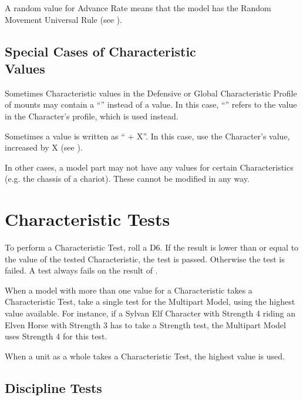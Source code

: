A random value for Advance Rate means that the model has the Random Movement Universal Rule (see ).

\subsection[Special Cases of Characteristic Values]{Special Cases of Characteristic\\ Values}
\label{special_cases_of_characteristic_values}

Sometimes Characteristic values in the Defensive or Global Characteristic Profile of mounts may contain a \enquote{\ascharacter{}} instead of a value. In this case, \enquote{\ascharacter{}} refers to the value in the Character’s profile, which is used instead.

Sometimes a value is written as \enquote{\ascharacter{} + X}. In this case, use the Character’s value, increased by X (see ).

In other cases, a model part may not have any values for certain Characteristics (e.g. the chassis of a chariot). These cannot be modified in any way.

\section{Characteristic Tests}
\label{characteristic_tests}

To perform a Characteristic Test, roll a D6. If the result is lower than or equal to the value of the tested Characteristic, the test is passed. Otherwise the test is failed. A test always fails on the result of .

When a model with more than one value for a Characteristic takes a Characteristic Test, take a single test for the Multipart Model, using the highest value available. For instance, if a Sylvan Elf Character with Strength 4 riding an Elven Horse with Strength 3 has to take a Strength test, the Multipart Model uses Strength 4 for this test.

When a unit as a whole takes a Characteristic Test, the highest value is used.

\subsection{Discipline Tests}
\label{discipline_tests}

